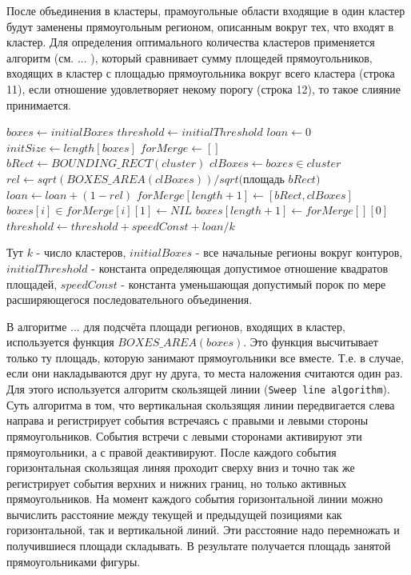 \documentclass[12pt]{report}
\begin{document}
После объединения в кластеры, прамоугольные области входящие в один кластер будут заменены прямоугольным регионом, описанным вокруг тех, что входят в кластер. Для определения оптимального количества кластеров применяется алгоритм (см. ... ), который сравнивает сумму площедей прямоугольников, входящих в кластер с площадью прямоугольника вокруг всего кластера (строка 11), если отношение удовлетворяет некому порогу (строка 12), то такое слияние принимается.
\begin{algorithmic}[1]
\STATE $boxes \gets initialBoxes$
\STATE $threshold \gets initialThreshold$
\STATE $loan \gets 0$
\REPEAT
\STATE $initSize \gets length[boxes]$
\STATE $forMerge \gets []$
\STATE $bRect\gets BOUNDING\_RECT(cluster)$
\STATE $clBoxes\gets boxes \in cluster$
\STATE $rel\gets sqrt(BOXES\_AREA(clBoxes))/sqrt($площадь $bRect)$
\STATE $loan \gets loan + (1 - rel)$
\STATE $forMerge[length+1] \gets [bRect, clBoxes]$
\ENDIF
\ENDFOR
\STATE $boxes[i] \in forMerge[i][1] \gets NIL$
\STATE $boxes[length+1] \gets forMerge[][0]$
\STATE $threshold \gets threshold + speedConst + loan/k$
\ENDFOR
{}
\end{algorithmic}
Тут $k$ - число кластеров, $initialBoxes$ - все начальные регионы вокруг контуров, $initialThreshold$ - константа определяющая допустимое отношение квадратов площадей, $speedConst$ - константа уменьшающая допустимый порок по мере расширяющегося последовательного объединения. 

В алгоритме ...  для подсчёта площади регионов, входящих в кластер, используется функция $BOXES\_AREA(boxes)$. Это функция высчитывает только ту площадь, которую занимают прямоугольники все вместе. Т.е. в случае, если они накладываются друг ну друга, то места наложения считаются один раз. Для этого используется алгоритм скользящей линии (\texttt{Sweep line algorithm}). Суть алгоритма в том, что вертикальная скользящяя линии передвигается слева направа и регистрирует события встречаясь с правыми и левыми стороны прямоугольников. События встречи с левыми сторонами активируют эти прямоугольники, а с правой деактивируют. После каждого события горизонтальная скользящая линяя проходит сверху вниз и точно так же регистрирует события верхних и нижних границ, но только активных прямоугольников. На момент каждого события горизонтальной линии можно вычислить расстояние между текущей и предыдущей позициями как горизонтальной, так и вертикальной линий. Эти расстояние надо перемножать и получившиеся площади складывать. В результате получается площадь занятой прямоугольниками фигуры.
\end{document}
